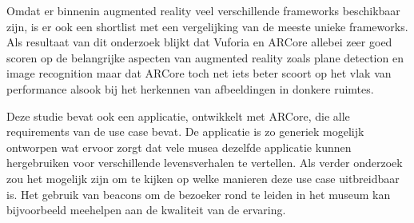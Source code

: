 Omdat er binnenin augmented reality veel verschillende frameworks beschikbaar zijn, is er ook een shortlist met een vergelijking van de meeste unieke frameworks.
Als resultaat van dit onderzoek blijkt dat Vuforia en ARCore allebei zeer goed scoren op de belangrijke aspecten van augmented reality zoals plane detection en image recognition maar dat ARCore toch net iets beter scoort op het vlak van performance alsook bij het herkennen van afbeeldingen in donkere ruimtes.

Deze studie bevat ook een applicatie, ontwikkelt met ARCore, die alle requirements van de use case bevat. De applicatie is zo generiek mogelijk ontworpen wat ervoor zorgt dat vele musea dezelfde applicatie kunnen hergebruiken voor verschillende levensverhalen te vertellen. Als verder onderzoek zou het mogelijk zijn om te kijken op welke manieren deze use case uitbreidbaar is. Het gebruik van beacons om de bezoeker rond te leiden in het museum kan bijvoorbeeld meehelpen aan de kwaliteit van de ervaring.